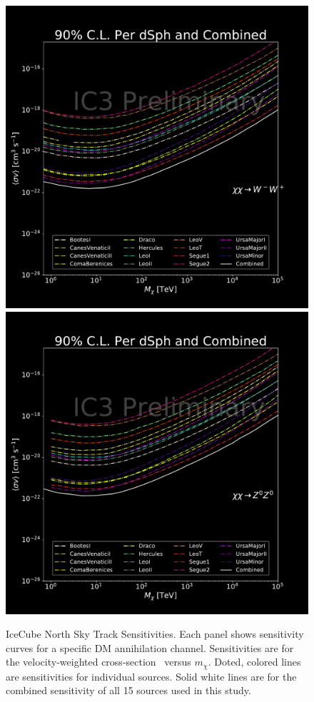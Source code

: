 \begin{figure}[t]
{        \includegraphics[scale=0.265]{figures/ic_DM/dm_plots/WW_money_plot_comb.pdf}
        \includegraphics[scale=0.265]{figures/ic_DM/dm_plots/ZZ_money_plot_comb.pdf}
    }
    \caption{IceCube North Sky Track Sensitivities. Each panel shows sensitivity curves for a specific DM annihilation channel. Sensitivities are for the velocity-weighted cross-section \sv~versus $m_\chi$. Doted, colored lines are sensitivities for individual sources. Solid white lines are for the combined sensitivity of all 15 \GS sources used in this study.}
    \label{fig:icDM_sensitivity_1of2}
\end{figure}

